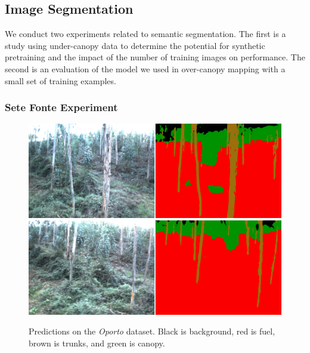 \subsection{Image Segmentation}
We conduct two experiments related to semantic segmentation. The first is a study using under-canopy data to determine the potential for synthetic pretraining and the impact of the number of training images on performance. The second is an evaluation of the model we used in over-canopy mapping with a small set of training examples.
\subsubsection{Sete Fonte Experiment}

\begin{figure}
   \centering
    \includegraphics[width=\linewidth]{figs/results/semantic_segmentation/SeteFontes/qualatative_001400.png}  
    \includegraphics[width=\linewidth]{figs/results/semantic_segmentation/SeteFontes/qualatative_001600.png}  
    \caption{Predictions on the \textit{Oporto} dataset. Black is background, red is fuel, brown is trunks, and green is canopy.
    } 
    \label{fig:results:oporto_semantic_seg_qual}
\end{figure}

